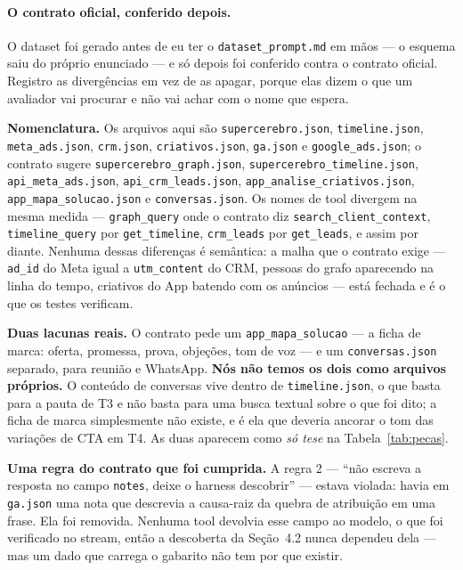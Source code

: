 \documentclass[10pt,twocolumn]{article}
\newcommand{\code}[1]{\texttt{\footnotesize #1}}
\begin{document}
\paragraph{O contrato oficial, conferido depois.} O dataset foi gerado antes de eu ter o
\code{dataset\_prompt.md} em mãos --- o esquema saiu do próprio enunciado --- e só depois foi
conferido contra o contrato oficial. Registro as divergências em vez de as apagar, porque
elas dizem o que um avaliador vai procurar e não vai achar com o nome que espera.

{\raggedright
\textbf{Nomenclatura.} Os arquivos aqui são \code{supercerebro.json},
\code{timeline.json}, \code{meta\_ads.json}, \code{crm.json}, \code{criativos.json},
\code{ga.json} e \code{google\_ads.json}; o contrato sugere
\code{supercerebro\_graph.json}, \code{supercerebro\_timeline.json},
\code{api\_meta\_ads.json}, \code{api\_crm\_leads.json},
\code{app\_analise\_criativos.json}, \code{app\_mapa\_solucao.json} e
\code{conversas.json}. Os nomes de tool divergem na mesma medida ---
\code{graph\_query} onde o contrato diz \code{search\_client\_context},
\code{timeline\_query} por \code{get\_timeline}, \code{crm\_leads} por \code{get\_leads},
e assim por diante. Nenhuma dessas diferenças é semântica: a malha que o contrato exige ---
\code{ad\_id} do Meta igual a \code{utm\_content} do CRM, pessoas do grafo aparecendo na
linha do tempo, criativos do App batendo com os anúncios --- está fechada e é o que os
testes verificam.\par}

\textbf{Duas lacunas reais.} O contrato pede um \code{app\_mapa\_solucao} --- a ficha de
marca: oferta, promessa, prova, objeções, tom de voz --- e um \code{conversas.json}
separado, para reunião e WhatsApp. \textbf{Nós não temos os dois como arquivos próprios.} O
conteúdo de conversas vive dentro de \code{timeline.json}, o que basta para a pauta de T3 e
não basta para uma busca textual sobre o que foi dito; a ficha de marca simplesmente não
existe, e é ela que deveria ancorar o tom das variações de CTA em T4. As duas aparecem como
\emph{só tese} na Tabela~\ref{tab:pecas}.

\textbf{Uma regra do contrato que foi cumprida.} A regra 2 --- ``não escreva a resposta no
campo \code{notes}, deixe o harness descobrir'' --- estava violada: havia em \code{ga.json}
uma nota que descrevia a causa-raiz da quebra de atribuição em uma frase. Ela foi removida.
Nenhuma tool devolvia esse campo ao modelo, o que foi verificado no stream, então a
descoberta da Seção~4.2 nunca dependeu dela --- mas um dado que carrega o gabarito não tem
por que existir.
\end{document}
